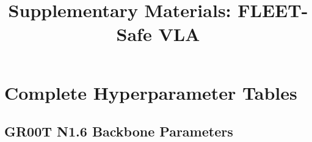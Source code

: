\documentclass[conference]{IEEEtran}
\begin{document}
\title{Supplementary Materials: FLEET-Safe VLA}
\author{
}
\maketitle

\section{Complete Hyperparameter Tables}
\label{sec:supp_hyper}

\subsection{GR00T N1.6 Backbone Parameters}
\end{document}
